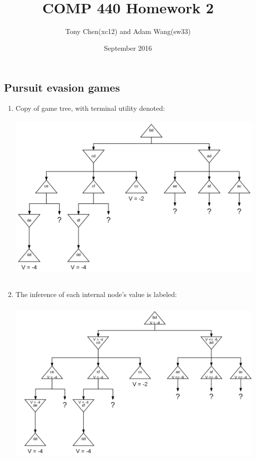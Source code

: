 \documentclass[11pt]{article}
\title{COMP 440 Homework 2}
\author{Tony Chen(xc12) and Adam Wang(sw33)}
\date{September 2016}
\begin{document}
\begin{onehalfspace}
\maketitle{}
\section{Pursuit evasion games}
 \renewcommand{\theenumi}{\alph{enumi}}
    \begin{enumerate}
    \item Copy of game tree, with terminal utility denoted:\\
     \includegraphics[width=16cm, height=9cm]{1_a.png}\\
     \item The inference of each internal node's value is labeled:\\
     \includegraphics[width=16cm, height=9cm]{1_b.png}\\

\end{enumerate}
\end{onehalfspace}
\end{document}
